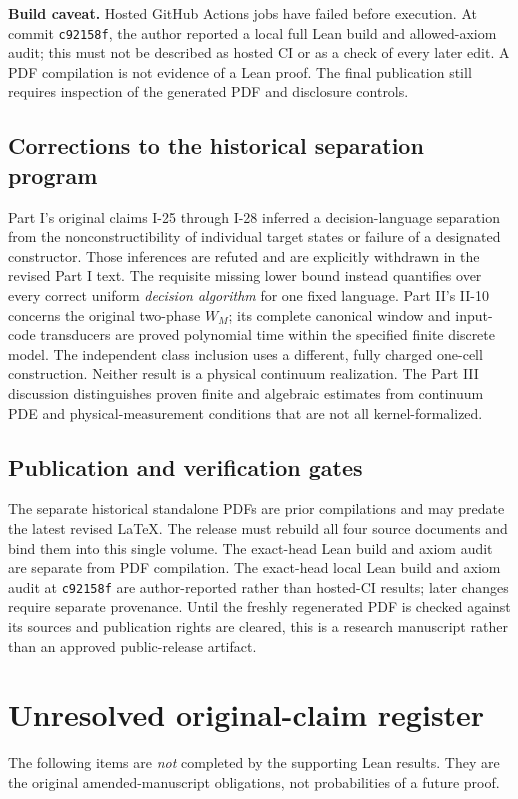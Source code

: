 \documentclass[11pt]{article}
\begin{document}
\textbf{Build caveat.} Hosted GitHub Actions jobs have failed before execution. At commit \texttt{c92158f}, the author reported a local full Lean build and allowed-axiom audit; this must not be described as hosted CI or as a check of every later edit. A PDF compilation is not evidence of a Lean proof. The final publication still requires inspection of the generated PDF and disclosure controls.

\subsection{Corrections to the historical separation program}
Part I's original claims I-25 through I-28 inferred a
decision-language separation from the nonconstructibility
of individual target states or failure of a designated
constructor.  Those inferences are refuted and are
explicitly withdrawn in the revised Part I text.
The requisite missing lower bound instead quantifies
over every correct uniform \emph{decision algorithm}
for one fixed language.  Part II's II-10 concerns
the original two-phase $W_M$; its complete canonical
window and input-code transducers are proved
polynomial time within the specified finite discrete
model. The independent class inclusion uses a
different, fully charged one-cell construction.
Neither result is a physical continuum realization.
The Part III discussion distinguishes proven finite
and algebraic estimates from continuum PDE and
physical-measurement conditions that are not
all kernel-formalized.

\subsection{Publication and verification gates}
The separate historical standalone PDFs are prior
compilations and may predate the latest revised
LaTeX.  The release must rebuild all four source
documents and bind them into this single volume.
The exact-head Lean build and axiom audit
are separate from PDF compilation.  The exact-head local Lean build and axiom audit at
\texttt{c92158f} are author-reported rather than
hosted-CI results; later changes require separate
provenance. Until the freshly regenerated PDF is
checked against its sources and publication rights
are cleared, this is a research manuscript rather
than an approved public-release artifact.

\section{Unresolved original-claim register}
The following items are \emph{not} completed by the
supporting Lean results.  They are the original
amended-manuscript obligations, not probabilities
of a future proof.
\end{document}
